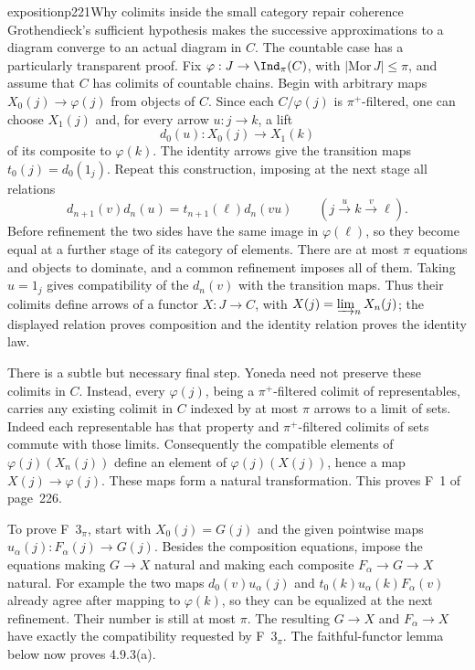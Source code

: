 \begin{dcomment}{exposition}{p221}{Why colimits inside the small category repair coherence}
Grothendieck's sufficient hypothesis makes the successive approximations to a diagram converge to an actual diagram in $C$. The countable case has a particularly transparent proof. Fix $\varphi:J\to\Ind_\pi(C)$, with $|\mathrm{Mor}\,J|\leq\pi$, and assume that $C$ has colimits of countable chains. Begin with arbitrary maps $X_0(j)\to\varphi(j)$ from objects of $C$. Since each $C/\varphi(j)$ is $\pi^+$-filtered, one can choose $X_1(j)$ and, for every arrow $u:j\to k$, a lift
\[
 d_0(u):X_0(j)\longrightarrow X_1(k)
\]
of its composite to $\varphi(k)$. The identity arrows give the transition maps $t_0(j)=d_0(1_j)$. Repeat this construction, imposing at the next stage all relations
\[
 d_{n+1}(v)d_n(u)
 =t_{n+1}(\ell)d_n(vu)
 \qquad(j\xrightarrow{u}k\xrightarrow{v}\ell).
\]
Before refinement the two sides have the same image in $\varphi(\ell)$, so they become equal at a further stage of its category of elements. There are at most $\pi$ equations and objects to dominate, and a common refinement imposes all of them. Taking $u=1_j$ gives compatibility of the $d_n(v)$ with the transition maps. Thus their colimits define arrows of a functor $X:J\to C$, with $X(j)=\varinjlim_nX_n(j)$; the displayed relation proves composition and the identity relation proves the identity law.

There is a subtle but necessary final step. Yoneda need not preserve these colimits in $C$. Instead, every $\varphi(j)$, being a $\pi^+$-filtered colimit of representables, carries any existing colimit in $C$ indexed by at most $\pi$ arrows to a limit of sets. Indeed each representable has that property and $\pi^+$-filtered colimits of sets commute with those limits. Consequently the compatible elements of $\varphi(j)(X_n(j))$ define an element of $\varphi(j)(X(j))$, hence a map $X(j)\to\varphi(j)$. These maps form a natural transformation. This proves F~1 of page~226.

To prove F~$3_\pi$, start with $X_0(j)=G(j)$ and the given pointwise maps $u_\alpha(j):F_\alpha(j)\to G(j)$. Besides the composition equations, impose the equations making $G\to X$ natural and making each composite $F_\alpha\to G\to X$ natural. For example the two maps $d_0(v)u_\alpha(j)$ and $t_0(k)u_\alpha(k)F_\alpha(v)$ already agree after mapping to $\varphi(k)$, so they can be equalized at the next refinement. Their number is still at most $\pi$. The resulting $G\to X$ and $F_\alpha\to X$ have exactly the compatibility requested by F~$3_\pi$. The faithful-functor lemma below now proves 4.9.3(a).


\end{dcomment}
